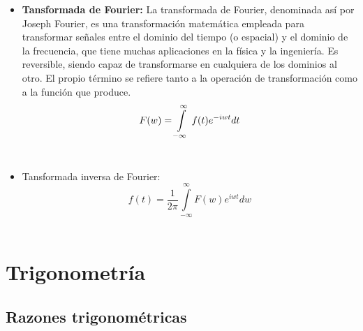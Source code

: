 \documentclass[letterpaper, 12pt]{article}
\begin{document}
\begin{itemize}
        \item \textbf{Tansformada de Fourier:} La transformada de Fourier, denominada así por Joseph Fourier, es una transformación matemática empleada para transformar señales entre el dominio del tiempo (o espacial) y el dominio de la frecuencia, que tiene muchas aplicaciones en la física y la ingeniería. Es reversible, siendo capaz de transformarse en cualquiera de los dominios al otro. El propio término se refiere tanto a la operación de transformación como a la función que produce. \\
        
            \begin{equation*}
                F(w)= \int\limits_{-\infty}^{\infty} \thinspace f(t)e^{-iwt} dt
            \end{equation*}\\
            
        \item Tansformada inversa de Fourier: \\
        
            \begin{equation*}
                f(t) = \frac{1}{2 \pi} \int\limits_{-\infty}^{\infty} F(w)e^{iwt} dw
            \end{equation*}\\
    
    \end{itemize}
    
    \newpage

\section{Trigonometría}

    \subsection{Razones trigonométricas}
    
\end{document}

